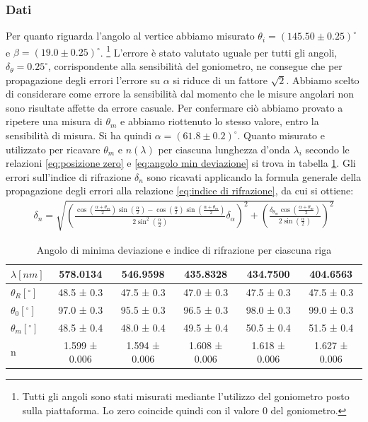\documentclass[a4paper]{article}
\begin{document}
\subsubsection{Dati}
Per quanto riguarda l'angolo al vertice abbiamo misurato $\theta_i = (145.50\pm0.25)^\circ$ e $\beta=(19.0\pm0.25)^\circ$. \footnote{Tutti gli angoli sono stati misurati mediante l'utilizzo del goniometro posto sulla piattaforma. Lo zero coincide quindi con il valore $0$ del goniometro.} L'errore è stato valutato uguale per tutti gli angoli, $\delta_{\theta}=0.25^\circ$, corrispondente alla sensibilità del goniometro, ne consegue che per propagazione degli errori l'errore su $\alpha$ si riduce di un fattore $\sqrt{2}$. Abbiamo scelto di considerare come errore la sensibilità dal momento che le misure angolari non sono risultate affette da errore casuale. Per confermare ciò abbiamo provato a ripetere una misura di $\theta_m$ e abbiamo riottenuto lo stesso valore, entro la sensibilità di misura. Si ha quindi $\alpha = (61.8 \pm 0.2)^\circ$. 
Quanto misurato e utilizzato per ricavare $\theta_m$ e $n(\lambda)$ per ciascuna lunghezza d'onda $\lambda_i$ secondo le relazioni \ref{eq:posizione zero} e \ref{eq:angolo min deviazione} si trova in tabella \ref{tab:indice di rifrazione e angoli}. Gli errori sull'indice di rifrazione $\delta_n$ sono ricavati applicando la formula generale della propagazione degli errori alla relazione \ref{eq:indice di rifrazione}, da cui si ottiene:
\begin{align}
    \delta_n = \sqrt{(\frac{\cos(\frac{\alpha+\theta_m}{2})\sin(\frac{\alpha}{2})-\cos(\frac{\alpha}{2})\sin(\frac{\alpha+\theta_m}{2})}{2\sin^2(\frac{\alpha}{2})}\delta_{\alpha})^2+(\frac{\delta_{\theta_m}\cos(\frac{\alpha+\theta_m}{2})}{2\sin(\frac{\alpha}{2})})^2}
\end{align}

\begin{table}[htbp]
\centering
\begin{tabular}{|l|ccccc|}
\hline
$\lambda [nm]$ & 578.0134 & 546.9598 & 435.8328 & 434.7500 & 404.6563 \\\hline
$\theta_R [^\circ]$ & 48.5 ± 0.3 & 47.5 ± 0.3 & 47.0 ± 0.3 & 47.5 ± 0.3 & 47.5 ± 0.3 \\\hline
$\theta_0 [^\circ]$ & 97.0 ± 0.3 & 95.5 ± 0.3 & 96.5 ± 0.3 & 98.0 ± 0.3 & 99.0 ± 0.3 \\\hline
$\theta_m [^\circ]$ & 48.5 ± 0.4 & 48.0 ± 0.4 & 49.5 ± 0.4 & 50.5 ± 0.4 & 51.5 ± 0.4 \\\hline
n & 1.599 ± 0.006 & 1.594 ± 0.006 & 1.608 ± 0.006 & 1.618 ± 0.006 & 1.627 ± 0.006 \\\hline
\end{tabular}
\caption{Angolo di minima deviazione e indice di rifrazione per ciascuna riga}
\label{tab:indice di rifrazione e angoli}
\end{table}
\end{document}
